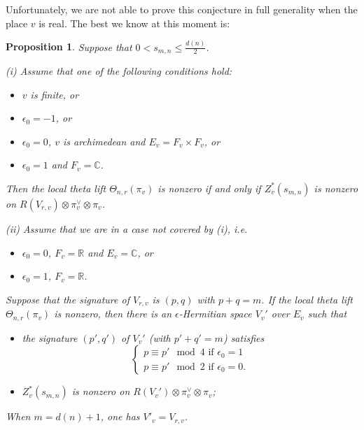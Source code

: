 \documentclass[10pt]{amsart}
\theoremstyle{plain}
\newtheorem{Prop}[equation]{Proposition}
\numberwithin{equation}{section}
\begin{document}
Unfortunately, we are not able to prove this conjecture in full
generality when the place $v$ is real. The best we know at this
moment is:
\vskip 5pt

\begin{Prop} \label{P:localnon0}
Suppose that $0< s_{m,n} \leq \frac{d(n)}{2}$.
\vskip 5pt

\noindent(i) Assume that one of the following conditions hold:
 \begin{itemize}
 \item $v$ is finite, or
 \item  $\epsilon_0 = -1$, or
 \item  $\epsilon_0 = 0$, $v$ is archimedean   and $E_v = F_v \times F_v$, or
 \item  $\epsilon_0 = 1$ and $F_v = {\mathbb C}$.
 \end{itemize}
 Then the local theta lift
 $\Theta_{n,r}(\pi_v)$ is nonzero if and only if $Z_v^*(s_{m,n})$ is
 nonzero on $R(V_{r,v}) \otimes \pi_v^{\vee} \otimes \pi_v$. 
 \vskip 5pt
 
 \noindent (ii) Assume that we are in a case not covered by (i), i.e.
 \begin{itemize}
 \item $\epsilon_0 = 0$, $F_v = {\mathbb{R}}$ and $E_v = {\mathbb C}$, or
 \item $\epsilon_0 = 1$, $F_v = {\mathbb{R}}$.
 \end{itemize}
 Suppose that the signature of $V_{r,v}$ is $(p,q)$ with $p+q = m$. 
 If  the local theta lift
 $\Theta_{n,r}(\pi_v)$ is nonzero, then there is an
 $\epsilon$-Hermitian space $V_v'$  over $E_v$
  such that
  \begin{itemize}
  \item[(a)]  the signature $(p',q')$ of $V_v'$ (with $p'+q' = m$) satisfies
\[   \begin{cases}
 p\equiv p' \mod 4 \text{  if  $\epsilon_0 = 1$} \\
 p \equiv p' \mod 2 \text{  if $\epsilon_0 = 0$.} \end{cases}  \]
 \item[(b)]  $Z_v^*(s_{m,n})$ is  nonzero on $R(V_v') \otimes \pi_v^{\vee} \otimes \pi_v$; 
 \end{itemize}
 When $m=d(n)+1$, one has $V'_v = V_{r,v}$.
  \end{Prop}
  \vskip 5pt
  
\end{document}
